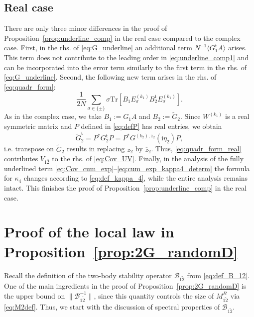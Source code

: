 \documentclass[10pt]{amsart}
\numberwithin{equation}{section}
\newcommand{\ii}{\mathrm{i}}
\newcommand{\mt}{\mathfrak{t}}
\begin{document}
\subsection{Real case}\label{sec:Cov_real} There are only three minor differences in the proof of Proposition~\ref{prop:underline_comp} in the real case compared to the complex case. First, in the rhs. of \eqref{eq:G_underline} an additional term $N^{-1}\langle G_1^\mt A\rangle$ arises. This term does not contribute to the leading order in \eqref{eq:underline_comp1} and can be incorporated into the error term similarly to the first term in the rhs. of \eqref{eq:G_underline}. Second, the following new term arises in the rhs. of \eqref{eq:quadr_form}:
\begin{equation}
\frac{1}{2N}\sum_{\sigma\in\{\pm\}}\sigma  \mathrm{Tr}\left[ B_1E_\sigma^{(k_1)}B_2^\mt E_\sigma^{(k_1)}\right].
\label{eq:quadr_form_real}
\end{equation}
As in the complex case, we take $B_1:=G_1A$ and $B_2:=\widetilde{G}_2$. Since $W^{(k_1)}$ is a real symmetric matrix and $P$ defined in \eqref{eq:defP} has real entries, we obtain
\begin{equation}
\widetilde{G}_2^\mt =P^*G_2^\mt P = P^*G^{(k_2),\overline{z}_2}(\ii\eta_2)P,
\end{equation}
i.e. transpose on $\widetilde{G}_2$ results in replacing $z_2$ by $\overline{z}_2$. Thus, \eqref{eq:quadr_form_real} contributes $V_{1\overline{2}}$ to the rhs. of \eqref{eq:Cov_UV}. Finally, in the analysis of the fully underlined term \eqref{eq:Cov_cum_exp}--\eqref{eq:cum_exp_kappa4_determ} the formula for $\kappa_4$ changes according to \eqref{eq:def_kappa_4}, while the entire analysis remains intact. This finishes the proof of Proposition~\ref{prop:underline_comp} in the real case.


\section{Proof of the local law in Proposition~\ref{prop:2G_randomD}}\label{sec:local_law_proof}

Recall the definition of the two-body stability operator $\mathcal{B}_{1\widetilde{2}}$ from \eqref{eq:def_B_12}. One of the main ingredients in the proof of Proposition~\ref{prop:2G_randomD} is the upper bound on $\|\mathcal{B}_{1\widetilde{2}}^{-1}\|$, since this quantity controls the size of $M_{1\widetilde{2}}^B$ via \eqref{eq:M2def}. Thus, we start with the discussion of spectral properties of $\mathcal{B}_{1\widetilde{2}}$. 
\end{document}
